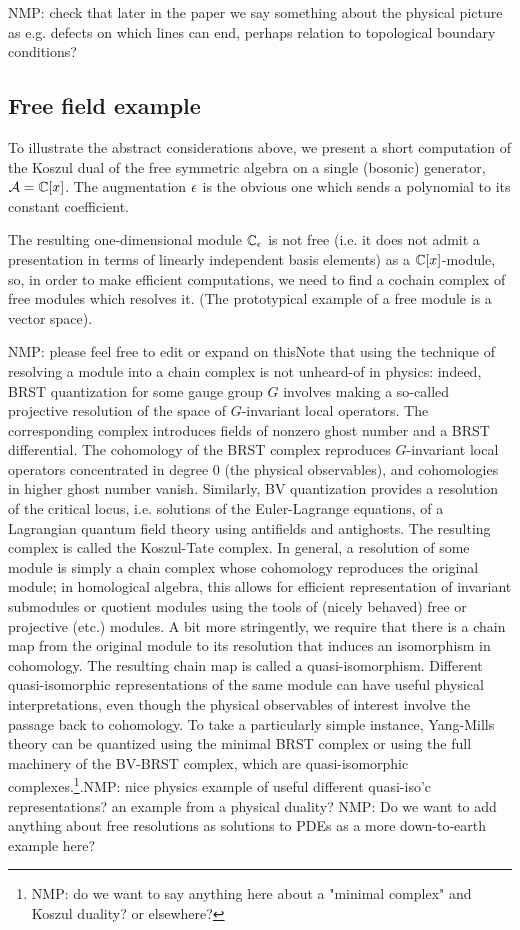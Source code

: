\documentclass[11pt]{amsart}
\def\natalie#1{{\textcolor{green!65!black}{NMP: {#1}}}}
\begin{document}
\natalie{check that later in the paper we say something about the physical picture as e.g. defects on which lines can end, perhaps relation to topological boundary conditions?}

\subsection{Free field example} 

To illustrate the abstract considerations above, we present a short computation of the Koszul dual of the free symmetric algebra on a single (bosonic) generator, $\mathcal A = \mathbb C[x]$. 
The augmentation $\epsilon$ is the obvious one which sends a polynomial to its constant coefficient. 

The resulting one-dimensional module $\mathbb C_{\epsilon}$ is not free (i.e. it does not admit a presentation in terms of linearly independent basis elements) as a $\mathbb C[x]$-module, so, in order to make efficient computations, we need to find a cochain complex of free modules which resolves it. (The prototypical example of a free module is a vector space). 

\natalie{please feel free to edit or expand on this}Note that using the technique of resolving a module into a chain complex  is not unheard-of in physics: indeed, BRST quantization for some gauge group $G$ involves making a so-called projective resolution of the space of $G$-invariant local operators. The corresponding complex introduces fields of nonzero ghost number and a BRST differential. The cohomology of the BRST complex reproduces $G$-invariant local operators concentrated in degree 0 (the physical observables), and cohomologies in higher ghost number vanish. Similarly, BV quantization provides a resolution of the critical locus, i.e. solutions of the Euler-Lagrange equations, of a Lagrangian quantum field theory using antifields and antighosts. The resulting complex is called the Koszul-Tate complex. In general, a resolution of some module is simply a chain complex whose cohomology reproduces the original module; in homological algebra, this allows for efficient representation of invariant submodules or quotient modules using the tools of (nicely behaved) free or projective (etc.) modules. A bit more stringently, we require that there is a chain map from the original module to its resolution that induces an isomorphism in cohomology. The resulting chain map is called a quasi-isomorphism. Different quasi-isomorphic representations of the same module can have useful physical interpretations, even though the physical observables of interest involve the passage back to cohomology. To take a particularly simple instance, Yang-Mills theory can be quantized using the minimal BRST complex or using the full machinery of the BV-BRST complex, which are quasi-isomorphic complexes.\footnote{\natalie{do we want to say anything here about a "minimal complex" and Koszul duality? or elsewhere?}}.\natalie{nice physics example of useful different quasi-iso'c representations? an example from a physical duality?} 
\natalie{Do we want to add anything about free resolutions as solutions to PDEs as a more down-to-earth example here?}
\end{document}
